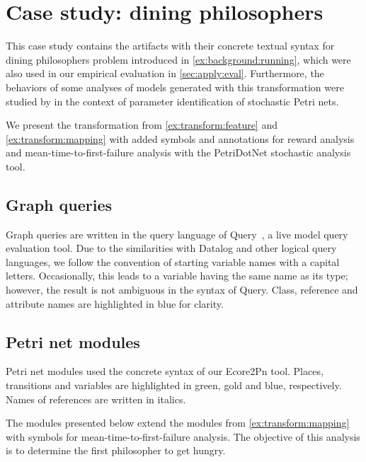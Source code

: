 \chapter{Case study: dining philosophers}
\label{app:phils}

This case study contains the artifacts with their concrete textual syntax for
dining philosophers problem introduced in \vref{ex:background:running}, which were also used in our empirical evaluation in \vref{sec:apply:eval}. Furthermore, the behaviors of some analyses of models generated with this transformation were studied by \citet[Chapter~5]{Molnar17optimization} in the context of parameter identification of stochastic Petri nets.

We present the transformation from \vref{ex:transform:feature} and \vref{ex:transform:mapping} with added symbols and annotations for reward analysis and mean-time-to-first-failure analysis with the PetriDotNet stochastic analysis tool.

\section{Graph queries}

Graph queries are written in the query language of  Query~\citep{Ujhelyi15incquery}, a live model query evaluation tool. Due to the similarities with Datalog and other logical query languages, we follow the convention of starting variable names with a capital letters. Occasionally, this leads to a variable having the same name as its type; however, the result is not ambiguous in the syntax of  Query. Class, reference and attribute names are highlighted in blue for clarity.



\section{Petri net modules}

Petri net modules used the concrete syntax of our Ecore2Pn tool. Places, transitions and variables are highlighted in green, gold and blue, respectively. Names of references are written in italics.

The  modules presented below extend the modules from \vref{ex:transform:mapping} with symbols for mean-time-to-first-failure analysis. The objective of this analysis is to determine the first philosopher to get hungry.

